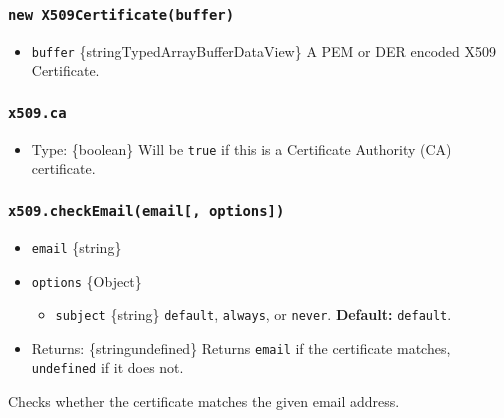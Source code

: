 \subsubsection{\texorpdfstring{\texttt{new\ X509Certificate(buffer)}}{new X509Certificate(buffer)}}\label{new-x509certificatebuffer}

\begin{itemize}
\tightlist
\item
  \texttt{buffer}
  \{string\textbar TypedArray\textbar Buffer\textbar DataView\} A PEM or
  DER encoded X509 Certificate.
\end{itemize}

\subsubsection{\texorpdfstring{\texttt{x509.ca}}{x509.ca}}\label{x509.ca}

\begin{itemize}
\tightlist
\item
  Type: \{boolean\} Will be \texttt{true} if this is a Certificate
  Authority (CA) certificate.
\end{itemize}

\subsubsection{\texorpdfstring{\texttt{x509.checkEmail(email{[},\ options{]})}}{x509.checkEmail(email{[}, options{]})}}\label{x509.checkemailemail-options}

\begin{itemize}
\tightlist
\item
  \texttt{email} \{string\}
\item
  \texttt{options} \{Object\}

  \begin{itemize}
  \tightlist
  \item
    \texttt{subject} \{string\}
    \texttt{\textquotesingle{}default\textquotesingle{}},
    \texttt{\textquotesingle{}always\textquotesingle{}}, or
    \texttt{\textquotesingle{}never\textquotesingle{}}.
    \textbf{Default:}
    \texttt{\textquotesingle{}default\textquotesingle{}}.
  \end{itemize}
\item
  Returns: \{string\textbar undefined\} Returns \texttt{email} if the
  certificate matches, \texttt{undefined} if it does not.
\end{itemize}

Checks whether the certificate matches the given email address.


